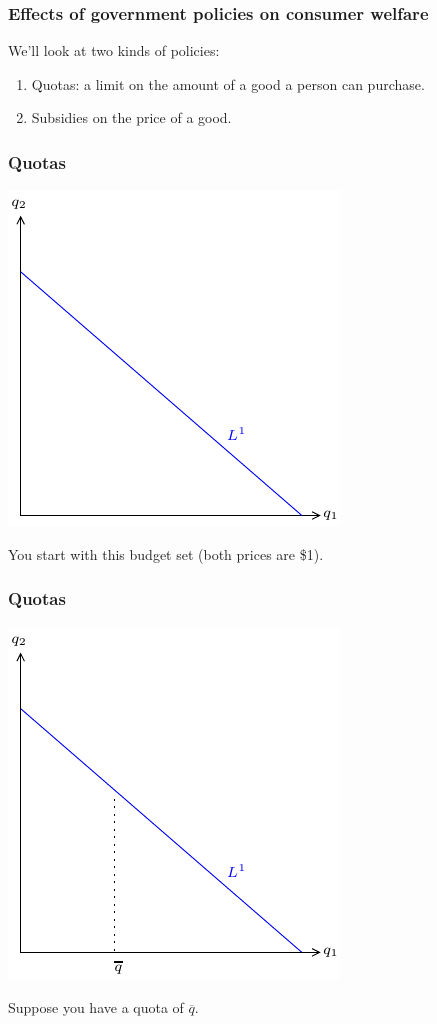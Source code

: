 \documentclass[xcolor=pdftex,dvipsnames]{beamer}
\begin{document}
\begin{frame}
\frametitle{Effects of government policies on consumer welfare}
We'll look at two kinds of policies:
\begin{enumerate}[<+->]
\item Quotas: a limit on the amount of a good a person can
  purchase. 
\item Subsidies on the price of a good.
\end{enumerate}
\end{frame}




\begin{frame}
\frametitle{Quotas}
\begin{center}
\includegraphics{pics/Quota1}
\end{center}
You start with this budget set (both prices are \$1).
\end{frame}


\begin{frame}
\frametitle{Quotas}
\begin{center}
\includegraphics{pics/Quota2}
\end{center}
Suppose you have a quota of $\overline q$.
\end{frame}
\end{document}
